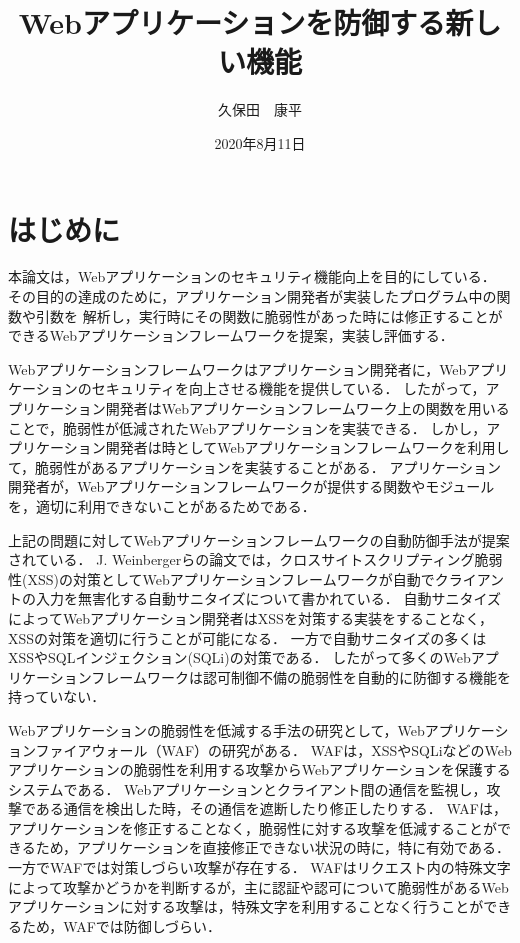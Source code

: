 \documentclass[twocolumn, 10pt, a4paper]{jsarticle}
\title{Webアプリケーションを防御する新しい機能}
\author{久保田　康平}
\date{2020年8月11日}
\begin{document}
\maketitle
\section{はじめに}
本論文は，Webアプリケーションのセキュリティ機能向上を目的にしている．
その目的の達成のために，アプリケーション開発者が実装したプログラム中の関数や引数を
解析し，実行時にその関数に脆弱性があった時には修正することができるWebアプリケーションフレームワークを提案，実装し評価する．

Webアプリケーションフレームワークはアプリケーション開発者に，Webアプリケーションのセキュリティを向上させる機能を提供している．
したがって，アプリケーション開発者はWebアプリケーションフレームワーク上の関数を用いることで，脆弱性が低減されたWebアプリケーションを実装できる．
しかし，アプリケーション開発者は時としてWebアプリケーションフレームワークを利用して，脆弱性があるアプリケーションを実装することがある．
アプリケーション開発者が，Webアプリケーションフレームワークが提供する関数やモジュールを，適切に利用できないことがあるためである．

上記の問題に対してWebアプリケーションフレームワークの自動防御手法が提案されている．
J. Weinbergerらの論文\cite{weinberger2011systematic}では，クロスサイトスクリプティング脆弱性(XSS)の対策としてWebアプリケーションフレームワークが自動でクライアントの入力を無害化する自動サニタイズについて書かれている．
自動サニタイズによってWebアプリケーション開発者はXSSを対策する実装をすることなく，XSSの対策を適切に行うことが可能になる．
一方で自動サニタイズの多くはXSSやSQLインジェクション(SQLi)の対策である．
したがって多くのWebアプリケーションフレームワークは認可制御不備の脆弱性を自動的に防御する機能を持っていない．

Webアプリケーションの脆弱性を低減する手法の研究として，Webアプリケーションファイアウォール（WAF）の研究\cite{kruegel2003anomaly, epp2017anomaly}がある．
WAFは，XSSやSQLiなどのWebアプリケーションの脆弱性を利用する攻撃からWebアプリケーションを保護するシステムである．
Webアプリケーションとクライアント間の通信を監視し，攻撃である通信を検出した時，その通信を遮断したり修正したりする．
WAFは，アプリケーションを修正することなく，脆弱性に対する攻撃を低減することができるため，アプリケーションを直接修正できない状況の時に，特に有効である．
一方でWAFでは対策しづらい攻撃が存在する．
WAFはリクエスト内の特殊文字によって攻撃かどうかを判断するが，主に認証や認可について脆弱性があるWebアプリケーションに対する攻撃は，特殊文字を利用することなく行うことができるため，WAFでは防御しづらい．
\end{document}
